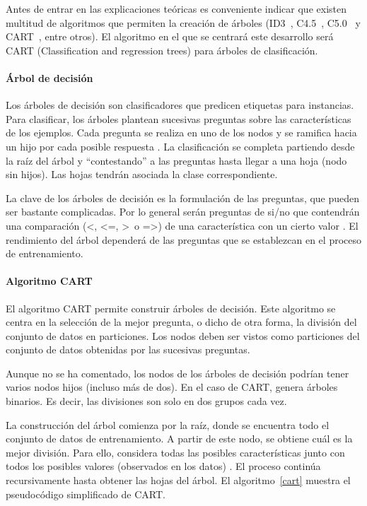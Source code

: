 Antes de entrar en las explicaciones teóricas es conveniente indicar que existen multitud de algoritmos que permiten la creación de árboles (ID3~\cite{quinlan1986induction}, C4.5~\cite{quinlan2014c4}, C5.0~\cite{quinlan2004c5} y CART~\cite{breiman2017classification}, entre otros). El algoritmo en el que se centrará este desarrollo será CART (Classification and regression trees) para árboles de clasificación. 

\paragraph{Árbol de decisión}

Los árboles de decisión son clasificadores que predicen etiquetas para instancias. Para clasificar, los árboles plantean sucesivas preguntas sobre las características de los ejemplos. Cada pregunta se realiza en uno de los nodos y se ramifica hacia un hijo por cada posible respuesta \cite{kingsford2008decision}. La clasificación se completa partiendo desde la raíz del árbol y ``contestando'' a las preguntas hasta llegar a una hoja (nodo sin hijos). Las hojas tendrán asociada la clase correspondiente. 

La clave de los árboles de decisión es la formulación de las preguntas, que pueden ser bastante complicadas. Por lo general serán preguntas de si/no que contendrán una comparación (<, <=, >~o =>) de una característica con un cierto valor \cite{kingsford2008decision}. El rendimiento del árbol dependerá de las preguntas que se establezcan en el proceso de entrenamiento.

\paragraph{Algoritmo CART}
El algoritmo CART permite construir árboles de decisión. Este algoritmo se centra en la selección de la mejor pregunta, o dicho de otra forma, la división del conjunto de datos en particiones. Los nodos deben ser vistos como particiones del conjunto de datos obtenidas por las sucesivas preguntas. 

Aunque no se ha comentado, los nodos de los árboles de decisión podrían tener varios nodos hijos (incluso más de dos). En el caso de CART, genera árboles binarios. Es decir, las divisiones son solo en dos grupos cada vez.

La construcción del árbol comienza por la raíz, donde se encuentra todo el conjunto de datos de entrenamiento. A partir de este nodo, se obtiene cuál es la mejor división. Para ello, considera todas las posibles características junto con todos los posibles valores (observados en los datos) \cite{lewis2000introduction}. El proceso continúa recursivamente hasta obtener las hojas del árbol. El algoritmo~\ref{cart} muestra el pseudocódigo simplificado de CART.


